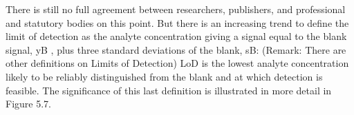 There is still no full agreement between researchers, publishers, and professional and statutory bodies on this point. But there is an increasing trend to define the limit of detection as the analyte concentration giving a signal equal to the blank signal, yB , plus three standard deviations of the blank, sB:
(Remark: There are other definitions on Limits of Detection)
LoD is the lowest analyte concentration likely to be reliably distinguished from the blank and at which detection is feasible.
The significance of this last definition is illustrated in more detail in Figure 5.7.


